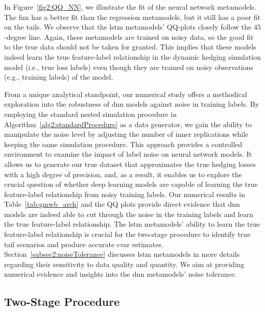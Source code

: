 In Figure~\ref{fig2:QQ_NN}, we illustrate the fit of the neural network metamodels.
The \gls{fnn} has a better fit than the regression metamodels, but it still has a poor fit on the tails.
We observe that the \gls{lstm} metamodels' QQ-plots closely follow the $45$-degree line.
Again, these metamodels are trained on noisy data, so the good fit to the true data should not be taken for granted.
This implies that these models indeed learn the true feature-label relationship in the dynamic hedging simulation model (i.e., true loss labels) even though they are trained on noisy observations (e.g., training labels) of the model.

From a unique analytical standpoint, our numerical study offers a methodical exploration into the robustness of \gls{dnn} models against noise in training labels. 
By employing the standard nested simulation procedure in Algorithm~\ref{alg2:standardProcedure} as a data generator, we gain the ability to manipulate the noise level by adjusting the number of inner replications while keeping the same simulation procedure.
This approach provides a controlled environment to examine the impact of label noise on neural network models.
It allows us to generate our true dataset that approximates the true hedging losses with a high degree of precision, and, as a result, it enables us to explore the crucial question of whether deep learning models are capable of learning the true feature-label relationship from noisy training labels.
Our numerical results in Table~\ref{tab:gmwb_arch} and the QQ plots provide direct evidence that \gls{dnn} models are indeed able to cut through the noise in the training labels and learn the true feature-label relationship.
The \gls{lstm} metamodels' ability to learn the true feature-label relationship is crucial for the two-stage procedure to identify true tail scenarios and produce accurate \gls{cvar} estimates.
Section~\ref{subsec2:noiseTolerance} discusses \gls{lstm} metamodels in more details regarding their sensitivity to data quality and quantity.
We aim at providing numerical evidence and insights into the \gls{dnn} metamodels' noise tolerance.

\subsection{Two-Stage Procedure} \label{subsec:twoStageProcedure}

